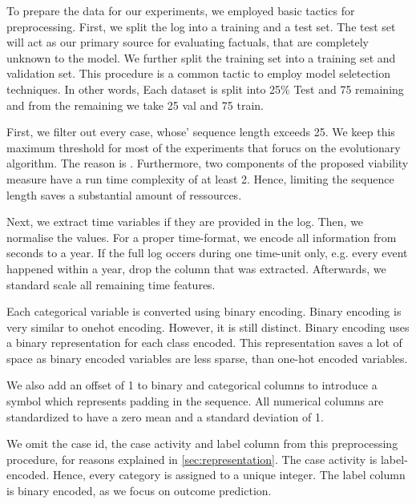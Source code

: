 \documentclass[./../../paper.tex]{subfiles}
\begin{document}
To prepare the data for our experiments, we employed basic tactics for preprocessing. First, we split the log into a training and a test set. The test set will act as our primary source for evaluating factuals, that are completely unknown to the model. We further split the training set into a training set and validation set. This procedure is a common tactic to employ model seletection techniques.  In other words, Each dataset is split into 25\% Test and 75 remaining and from the remaining we take 25 val and 75 train.

First, we filter out every case, whose' sequence length exceeds 25.  We keep this maximum threshold for most of the experiments that forucs on the evolutionary algorithm. The reason is . Furthermore, two components of the proposed viability measure have a run time complexity of at least 2. Hence, limiting the sequence length saves a substantial amount of ressources.

Next, we extract time variables if they are provided in the log. Then, we normalise the values. For a proper time-format, we encode all information from seconds to a year. If the full log occers during one time-unit only, e.g. every event happened within a year, drop the column that was extracted.  Afterwards, we standard scale all remaining time features.

Each categorical variable is converted using binary encoding. Binary encoding is very similar to onehot encoding. However, it is still distinct. Binary encoding uses a binary representation for each class encoded. This representation saves a lot of space as binary encoded variables are less sparse, than one-hot encoded variables.


We also add an offset of 1 to binary and categorical columns to introduce a symbol which represents padding in the sequence. All numerical columns are standardized to have a zero mean and a standard deviation of 1.

We omit the case id, the case activity and label column from this preprocessing procedure, for reasons explained in \autoref{sec:representation}. The case activity is label-encoded. Hence, every category is assigned to a unique integer. The label column is binary encoded, as we focus on outcome prediction.


  
\end{document}
